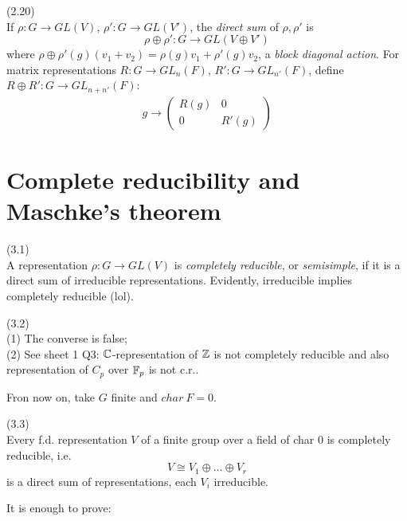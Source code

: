 \documentclass[a4paper]{article}
\begin{document}
\begin{defi} (2.20)\\
If $\rho:G \to GL(V)$, $\rho':G \to GL(V')$, the \emph{direct sum} of $\rho,\rho'$ is $$\rho \oplus \rho':G \to GL(V \oplus V')$$ where $\rho \oplus \rho'(g) (v_1+v_2) = \rho(g)v_1 + \rho'(g) v_2$, a \emph{block diagonal action}. For matrix representations $R:G \to GL_n(F)$, $R':G \to GL_{n'} (F)$, define $R \oplus R': G \to GL_{n+n'}(F)$:
\begin{equation*}
\begin{aligned}
g \to \begin{pmatrix}
R(g) & 0\\
0 & R'(g)
\end{pmatrix}
\end{aligned}
\end{equation*}
\end{defi}

\newpage
\section{Complete reducibility and Maschke's theorem}
\begin{defi} (3.1)\\
A representation $\rho:G \to GL(V)$ is \emph{completely reducible}, or \emph{semisimple}, if it is a direct sum of irreducible representations. Evidently, irreducible implies completely reducible (lol).
\end{defi}

\begin{rem} (3.2)\\
(1) The converse is false;\\
(2) See sheet 1 Q3: $\mathbb{C}$-representation of $\mathbb{Z}$ is not completely reducible and also representation of $C_p$ over $\mathbb{F}_p$ is not c.r..

Fron now on, take $G$ finite and $char\ F =0$.
\end{rem}

\begin{thm} (3.3)\\
Every f.d. representation $V$ of a finite group over a field of char $0$ is completely reducible, i.e. $$V \cong V_1 \oplus ... \oplus V_r$$is a direct sum of representations, each $V_i$ irreducible.
\end{thm}

It is enough to prove:
\end{document}
